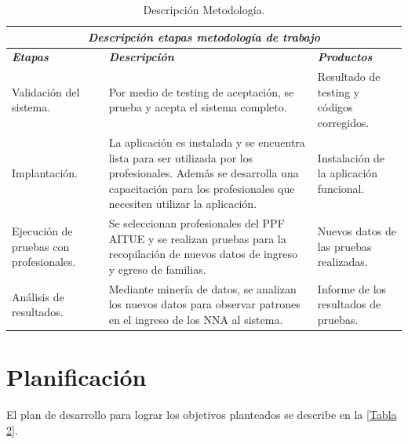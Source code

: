 \documentclass[12pt,letterpaper]{article}
\begin{document}
%
\begin{table}[htf]
\begin{tabular}{| p{4.5cm} | p{4.5cm} | p{4.5cm} |}
\hline
\multicolumn{3}{|c|}{\textbf{\textit{Descripci\'on etapas metodología de trabajo}}} \\ \hline
\textit{\textbf{Etapas}} & 
\textit{\textbf{Descripci\'on}} & 
\textit{\textbf{Productos}}
\\ \hline
{Validación del sistema.} & 
{Por medio de testing de aceptación, se prueba y acepta el sistema completo.} & 
{Resultado de testing y códigos corregidos.} 
\\ \hline
{Implantación.} & 
{La aplicación es instalada y se encuentra lista para ser utilizada por los profesionales. Además se desarrolla una capacitación para los profesionales que necesiten utilizar la aplicación.} & 
{Instalación de la aplicación funcional.}  
\\ \hline
{Ejecución de pruebas con profesionales.} & 
{Se seleccionan profesionales del PPF AITUE y se realizan pruebas para la recopilación de nuevos datos de ingreso y egreso de familias.} &
{Nuevos datos de las pruebas realizadas.} 
\\ \hline
{Análisis de resultados. } & 
{Mediante minería de datos, se analizan los nuevos datos para observar patrones en el ingreso de los NNA al sistema.} & 
{Informe de los resultados de pruebas.} 
\\ \hline

\end{tabular}
\caption{Descripci\'on Metodolog\'ia.}
\end{table}

\newpage
\clearpage
%
\section{Planificaci\'on}
\label{plan}

El plan de desarrollo para lograr los objetivos planteados se describe en la \ref{Tabla 2}.
\end{document}
